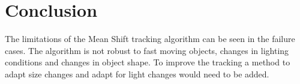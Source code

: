 \documentclass[9pt]{IEEEtran}
\begin{document}
\section{Conclusion}
The limitations of the Mean Shift tracking algorithm can be seen in the failure cases.
The algorithm is not robust to fast moving objects, changes in lighting conditions and changes in object shape.
To improve the tracking a method to adapt size changes and adapt for light changes would need to be added.





\end{document}
